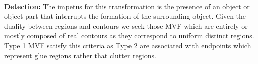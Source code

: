 \noindent\\
{\bf Detection:} The impetus for this transformation is the presence of an object or object part that interrupts the formation of the surrounding object. Given the duality between regions and contours we seek those MVF which are entirely or mostly composed of real contours as they correspond to uniform distinct regions. Type 1 MVF satisfy this criteria as Type 2 are associated with endpoints which represent glue regions rather that clutter regions. 







